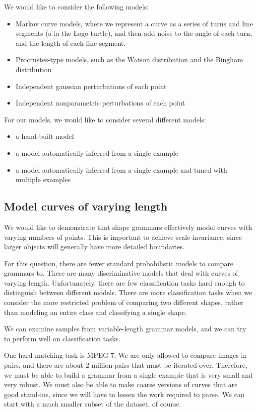 \documentclass{book}
\begin{document}
We would like to consider the following models:

\begin{itemize}
\item Markov curve models, where we represent a curve as a series of
    turns and line segments (a la the Logo turtle), and then add noise
    to the angle of each turn, and the length of each line segment.
\item Procrustes-type models, such as the Watson distribution and the
    Bingham distribution
\item Independent gaussian perturbations of each point
\item Independent nonparametric perturbations of each point
\end{itemize}

For our models, we would like to consider several different models:
\begin{itemize}
\item a hand-built model
\item a model automatically inferred from a single example
\item a model automatically inferred from a single example and tuned
    with multiple examples
\end{itemize}
\subsection{Model curves of varying length}
\label{sec-2_2_2}

We would like to demonstrate that shape grammars effectively model
curves with varying numbers of points. This is important to achieve
scale invariance, since larger objects will generally have more
detailed boundaries.

For this question, there are fewer standard probabilistic models to
compare grammars to. There are many discriminative models that deal
with curves of varying length. Unfortunately, there are few
classification tasks hard enough to distinguish between different
models. There are more classification tasks when we consider the more
restricted problem of comparing two different shapes, rather than
modeling an entire class and classifying a single shape.

We can examine samples from variable-length grammar models, and we can
try to perform well on classification tasks.

One hard matching task is MPEG-7. We are only allowed to compare
images in pairs, and there are about 2 million pairs that must be
iterated over. Therefore, we must be able to build a grammar from a
single example that is very small and very robust. We must also be
able to make coarse versions of curves that are good stand-ins, since
we will have to lessen the work required to parse. We can start with a
much smaller subset of the dataset, of course.
\end{document}
